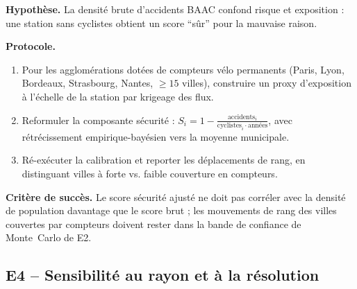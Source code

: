 \documentclass[11pt,a4paper]{article}
\begin{document}
\begin{experience}[title=E3 -- Ajustement par exposition cycliste]
\textbf{Hypothèse.} La densité brute d'accidents BAAC confond
risque et exposition \citep{Reynolds2009, Schepers2014} : une
station sans cyclistes obtient un score \enquote{sûr} pour la
mauvaise raison.

\textbf{Protocole.}
\begin{enumerate}[leftmargin=*,itemsep=0.2em]
    \item Pour les agglomérations dotées de compteurs vélo
    permanents (Paris, Lyon, Bordeaux, Strasbourg, Nantes,
    $\geq 15$ villes), construire un proxy d'exposition à
    l'échelle de la station par krigeage des flux.
    \item Reformuler la composante sécurité :
    $S_i = 1 - \tfrac{\text{accidents}_i}
                     {\text{cyclistes}_i\cdot\text{années}}$,
    avec rétrécissement empirique-bayésien vers la moyenne
    municipale.
    \item Ré-exécuter la calibration et reporter les
    déplacements de rang, en distinguant villes à forte vs.
    faible couverture en compteurs.
\end{enumerate}

\textbf{Critère de succès.} Le score sécurité ajusté ne doit pas
corréler avec la densité de population davantage que le score
brut ; les mouvements de rang des villes couvertes par compteurs
doivent rester dans la bande de confiance de Monte~Carlo de E2.
\end{experience}

\subsection{E4 -- Sensibilité au rayon et à la résolution}
\label{sec:exp-rayon}
\end{document}
